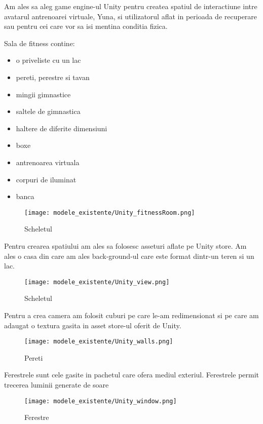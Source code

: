 \documentclass[12pt,a4paper]{report}
\begin{document}
Am ales sa aleg game engine-ul Unity pentru createa spatiul de interactiune intre avatarul antrenoarei virtuale, Yuna, si utilizatorul aflat in perioada de recuperare sau pentru cei care vor sa isi mentina conditia fizica.

Sala de fitness contine:
\begin{itemize}
    \item o priveliste cu un lac
    \item pereti, perestre si tavan
    \item mingii gimnastice
    \item saltele de gimnastica
    \item haltere de diferite dimensiuni
    \item boxe
    \item antrenoarea virtuala
    \item corpuri de iluminat
    \item banca
\end{itemize}

\begin{figure}[th]
\centering
\texttt{[image: modele\_existente/Unity\_fitnessRoom.png]} \caption[Scheletul]{Scheletul\protect\footnotemark}
  \label{figure_1:picture_10}
\end{figure}

Pentru crearea spatiului am ales sa folosesc asseturi aflate pe Unity store. Am ales o casa din care am ales back-ground-ul care este format dintr-un teren si un lac.

\begin{figure}[th]
\centering
\texttt{[image: modele\_existente/Unity\_view.png]}  \caption[Scheletul]{Scheletul\protect\footnotemark}
  \label{figure_1:picture_10}
\end{figure}

Pentru a crea camera am folosit cuburi pe care le-am redimensionat si pe care am adaugat o  textura gasita in asset store-ul oferit de Unity.

\begin{figure}[th]
\centering
\texttt{[image: modele\_existente/Unity\_walls.png]} \caption[Pereti]{Pereti\protect\footnotemark}
  \label{figure_1:picture_10}
\end{figure}

Ferestrele sunt cele gasite in pachetul care ofera mediul exteriul. Ferestrele permit trecerea luminii generate de soare

\begin{figure}[th]
\centering
\texttt{[image: modele\_existente/Unity\_window.png]} \caption[Ferestre]{Ferestre\protect\footnotemark}
  \label{figure_1:picture_10}
\end{figure}
\end{document}
